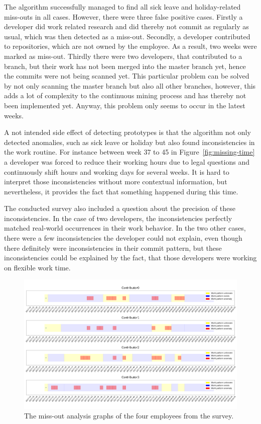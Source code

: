 The algorithm successfully managed to find all sick leave and holiday-related miss-outs in all cases.
However, there were three false positive cases.
Firstly a developer did work related research and did thereby not commit as regularly as usual, which was then detected as a miss-out.
Secondly, a developer contributed to repositories, which are not owned by the employee.
As a result, two weeks were marked as miss-out.
Thirdly there were two developers, that contributed to a branch, but their work has not been merged into the master branch yet, hence the commits were not being scanned yet.
This particular problem can be solved by not only scanning the master branch but also all other branches, however, this adds a lot of complexity to the continuous mining process and has thereby not been implemented yet.
Anyway, this problem only seems to occur in the latest weeks.

A not intended side effect of detecting prototypes is that the algorithm not only detected anomalies, such as sick leave or holiday but also found inconsistencies in the work routine.
For instance between week 37 to 45 in Figure~\ref{fig:missing-time} a developer was forced to reduce their working hours due to legal questions and continuously shift hours and working days for several weeks.
It is hard to interpret those inconsistencies without more contextual information, but nevertheless, it provides the fact that something happened during this time.

The conducted survey also included a question about the precision of these inconsistencies.
In the case of two developers, the inconsistencies perfectly matched real-world occurrences in their work behavior.
In the two other cases, there were a few inconsistencies the developer could not explain, even though there definitely were inconsistencies in their commit pattern, but these inconsistencies could be explained by the fact, that those developers were working on flexible work time.

\begin{figure}[h]
    \includegraphics[scale=0.19]{./graphs/analysis/work-time-analysis-comparison}
    \centering
    \caption{The miss-out analysis graphs of the four employees from the survey.}\label{fig:miss-out-comparison}
\end{figure}

